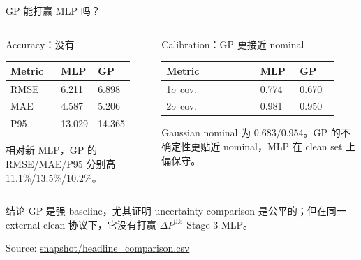 \documentclass[aspectratio=169,11pt]{beamer}
\newcommand{\good}[1]{\textcolor{goodGreen}{#1}}
\newcommand{\sourcenote}[1]{\vfill{\tiny\textcolor{gray!70!black}{Source: \url{#1}}}}
\begin{document}
\begin{frame}{GP 能打赢 MLP 吗？}
\small
\begin{columns}[T,onlytextwidth]
\begin{column}{0.48\linewidth}
\begin{block}{Accuracy：没有}
{\setlength{\tabcolsep}{3pt}
\begin{tabular}{L{0.48\linewidth}R{0.20\linewidth}R{0.20\linewidth}}
\toprule
Metric & MLP & GP \\
\midrule
RMSE & \good{6.211} & 6.898 \\
MAE & \good{4.587} & 5.206 \\
P95 & \good{13.029} & 14.365 \\
\bottomrule
\end{tabular}
}

\vspace{0.4em}
\footnotesize
相对新 MLP，GP 的 RMSE/MAE/P95 分别高 11.1\%/13.5\%/10.2\%。
\end{block}
\end{column}

\begin{column}{0.48\linewidth}
\begin{block}{Calibration：GP 更接近 nominal}
{\setlength{\tabcolsep}{3pt}
\begin{tabular}{L{0.48\linewidth}R{0.20\linewidth}R{0.20\linewidth}}
\toprule
Metric & MLP & GP \\
\(\sigma\) cov. & 0.774 & \good{0.670} \\
2\(\sigma\) cov. & 0.981 & \good{0.950} \\
\bottomrule
\end{tabular}
}

\vspace{0.4em}
\footnotesize
Gaussian nominal 为 0.683/0.954。GP 的不确定性更贴近 nominal，MLP 在 clean
set 上偏保守。
\end{block}
\end{column}
\end{columns}

\vspace{0.2em}
\begin{block}{结论}
GP 是强 baseline，尤其证明 uncertainty comparison 是公平的；但在同一 external
clean 协议下，它没有打赢 \(\Delta P^{0.5}\) Stage-3 MLP。
\end{block}

\sourcenote{snapshot/headline_comparison.csv}
\end{frame}
\end{document}
